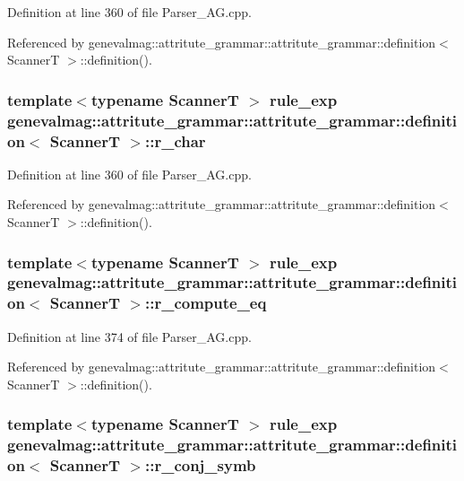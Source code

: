 Definition at line 360 of file Parser\_\-AG.cpp.

Referenced by genevalmag::attritute\_\-grammar::attritute\_\-grammar::definition$<$ ScannerT $>$::definition().\hypertarget{structgenevalmag_1_1attritute__grammar_1_1definition_fe8ea72fe74eed80ddbed202338cfcef}{
\subsubsection[{r\_\-char}]{\setlength{\rightskip}{0pt plus 5cm}template$<$typename ScannerT $>$ {\bf rule\_\-exp} genevalmag::attritute\_\-grammar::attritute\_\-grammar::definition$<$ ScannerT $>$::{\bf r\_\-char}}}
\label{structgenevalmag_1_1attritute__grammar_1_1definition_fe8ea72fe74eed80ddbed202338cfcef}




Definition at line 360 of file Parser\_\-AG.cpp.

Referenced by genevalmag::attritute\_\-grammar::attritute\_\-grammar::definition$<$ ScannerT $>$::definition().\hypertarget{structgenevalmag_1_1attritute__grammar_1_1definition_445baea0f15d8076128767b9325ee9a8}{
\subsubsection[{r\_\-compute\_\-eq}]{\setlength{\rightskip}{0pt plus 5cm}template$<$typename ScannerT $>$ {\bf rule\_\-exp} genevalmag::attritute\_\-grammar::attritute\_\-grammar::definition$<$ ScannerT $>$::{\bf r\_\-compute\_\-eq}}}
\label{structgenevalmag_1_1attritute__grammar_1_1definition_445baea0f15d8076128767b9325ee9a8}




Definition at line 374 of file Parser\_\-AG.cpp.

Referenced by genevalmag::attritute\_\-grammar::attritute\_\-grammar::definition$<$ ScannerT $>$::definition().\hypertarget{structgenevalmag_1_1attritute__grammar_1_1definition_d4b88fbf1b0b16ea04614b1d1bd92311}{
\subsubsection[{r\_\-conj\_\-symb}]{\setlength{\rightskip}{0pt plus 5cm}template$<$typename ScannerT $>$ {\bf rule\_\-exp} genevalmag::attritute\_\-grammar::attritute\_\-grammar::definition$<$ ScannerT $>$::{\bf r\_\-conj\_\-symb}}}
\label{structgenevalmag_1_1attritute__grammar_1_1definition_d4b88fbf1b0b16ea04614b1d1bd92311}




